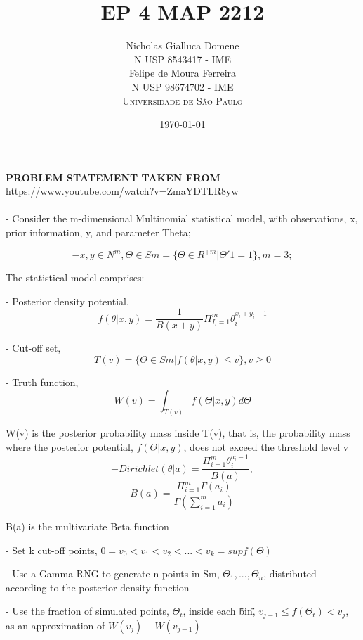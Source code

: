 \documentclass[12pt]{article}
\title{EP 4 MAP 2212} %
\author{Nicholas Gialluca Domene\\ %
N USP 8543417 - IME\\ %
Felipe de Moura Ferreira\\
N USP 98674702 - IME\\
\textsc{Universidade de São Paulo}
}
\date{\today} %
\begin{document}
\setlength{\droptitle}{-5em}    
\maketitle

\textbf{PROBLEM STATEMENT TAKEN FROM} https://www.youtube.com/watch?v=ZmaYDTLR8yw
\\ \\
- Consider the m-dimensional Multinomial statistical model,
with observations, x, prior information, y, and parameter Theta;

\begin{equation}
- x, y \in N^m, \Theta \in Sm = \{\Theta \in R^{+m} | \Theta'1 = 1\}, m = 3;
\end{equation}

The statistical model comprises:

- Posterior density potential, 
\begin{equation}
f(\theta|x, y) = \frac{1}{B(x + y)} \Pi_{I_i=1}^{m} \theta_i^{x_i + y_i - 1}
\end{equation}

- Cut-off set, 
\begin{equation}
T(v) = \{\Theta \in Sm | f(\theta|x, y) \leq v\}, v \geq 0
\end{equation}

- Truth function, 
\begin{equation}
W(v) = \int_{T(v)} f(\Theta|x, y) d\Theta
\end{equation}

W(v) is the posterior probability mass inside T(v), that is, 
the probability mass where the posterior potential, $f(\Theta|x, y)$,
does not exceed the threshold level v
\begin{equation}
- Dirichlet(\theta|a) = \frac{\Pi_{i=1}^m \theta_i^{a_i - 1}}{B(a)}, 
\end{equation}
\begin{equation}
B(a) = \frac{\Pi_{i=1}^m \Gamma(a_i)} {\Gamma(\sum_{i=1}^m a_i)}
\end{equation}

B(a) is the multivariate Beta function

- Set k cut-off points, $0 = v_0 < v_1 < v_2 < ... < v_k = sup f(\Theta)$

- Use a Gamma RNG to generate n points in Sm,
$\Theta_1, ..., \Theta_n$, distributed according to
the posterior density function

- Use the fraction of simulated points, $\Theta_t$, inside each
\"bin\", $v_{j-1} \leq f(\Theta_t) < v_j$, as an approximation of 
$W(v_j) - W(v_{j - 1})$
\end{document}
